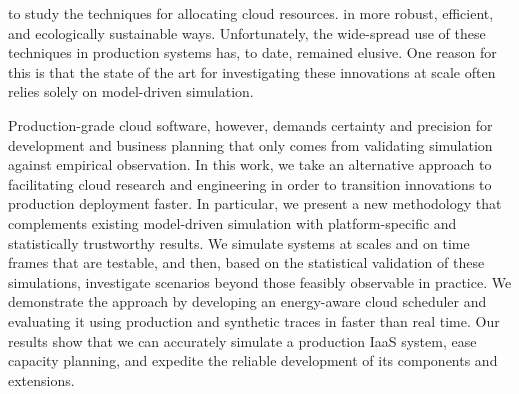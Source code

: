 \begin{comment}
[9] R. N. Calheiros, R. Ranjan, A. Beloglazov, C. A. D. Rose, and R. Buyya, “CloudSim: a toolkit for modeling and simulation of cloud computing environments and evaluation of resource provisioning algo- rithms,” Software: Practice and Experience, vol. 41, no. 1, pp. 23–50,
2011.
[10] D. Kliazovich, P. Bouvry, and S. U. Khan, “GreenCloud: a packet-level simulator of energy-aware cloud computing data centers,” The Journal
of Supercomputing, vol. 62, no. 3, pp. 1263–1283, 2012.
[11] B. Wickremasinghe, R. N. Calheiros, and R. Buyya, “Cloudanalyst: A CloudSim-based visual modeller for analysing cloud computing environments and applications,” in Advanced Information Networking
and Applications (AINA), 2010 24th IEEE International Conference on.
IEEE, 2010, pp. 446–452.
[12] S. K. Garg and R. Buyya, “Networkcloudsim: Modelling parallel applications in cloud simulations,” in Utility and Cloud Computing
(UCC), 2011 Fourth IEEE International Conference on. IEEE, 2011,
pp. 105–113.
[13] M. Tighe, G. Keller, M. Bauer, and H. Lutfiyya, “DCSim: A data centre simulation tool for evaluating dynamic virtualized resource management,” in Network and service management (cnsm), 2012 8th
international conference and 2012 workshop on systems virtualiztion
management (svm), Oct 2012, pp. 385–392.
[14] S. K. S. Gupta, R. Gilbert, A. Banerjee, Z. Abbasi, T. Mukherjee, and G. Varsamopoulos, “GDCSim: A tool for analyzing Green Data Center design and resource management techniques,” in Green Computing
Conference and Workshops (IGCC), 2011 International, July 2011, pp.
1–8.
\end{comment}


 to  study the techniques for  allocating  cloud  resources. in  more  robust,  efficient,  and
ecologically  sustainable  ways. Unfortunately,  the  wide-spread  use of  these
techniques in production systems has, to  date, remained elusive. One reason for
this is that the  state of the art for investigating  these innovations at scale
often  relies solely  on model-driven  simulation.


 Production-grade  cloud software,  however, demands  certainty and  precision for  development and  business
planning  that   only  comes   from  validating  simulation   against  empirical
observation.   In this  work, we  take an  alternative approach  to facilitating
cloud research and engineering in  order to transition innovations to production
deployment faster.  In particular, we present a new methodology that complements
existing  model-driven  simulation   with  platform-specific  and  statistically
trustworthy results.  We simulate systems at  scales and on time frames that are
testable, and  then, based on  the statistical validation of  these simulations,
investigate  scenarios   beyond  those  feasibly  observable   in  practice.  We
demonstrate  the approach  by  developing an  energy-aware  cloud scheduler  and
evaluating it  using production and synthetic  traces in faster than  real time.
Our results show that we can  accurately simulate a production IaaS system, ease
capacity planning, and  expedite the reliable development of  its components and
extensions.
